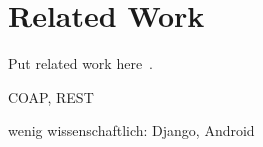 
\chapter{Related Work}
\label{sec:relatedwork}

Put related work here~\cite{mattern2010ict}.

COAP, REST

wenig wissenschaftlich: Django, Android